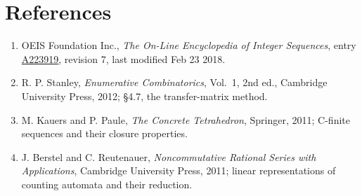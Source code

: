 \documentclass[11pt]{article}
\theoremstyle{definition}
\begin{document}
\section{References}

\begin{enumerate}

\item OEIS Foundation Inc., \emph{The On-Line Encyclopedia of Integer Sequences}, entry \href{https://oeis.org/A223919}{A223919}, revision 7, last modified Feb 23 2018.

\item R. P. Stanley, \emph{Enumerative Combinatorics}, Vol.~1, 2nd ed., Cambridge University Press, 2012; \S4.7, the transfer-matrix method.

\item M. Kauers and P. Paule, \emph{The Concrete Tetrahedron}, Springer, 2011; C-finite sequences and their closure properties.

\item J. Berstel and C. Reutenauer, \emph{Noncommutative Rational Series with Applications}, Cambridge University Press, 2011; linear representations of counting automata and their reduction.

\end{enumerate}
\end{document}
